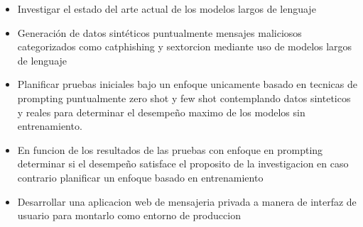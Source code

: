 \documentclass{article}
\begin{document}
\begin{itemize}
    \item Investigar el estado del arte actual de los modelos largos de lenguaje
    \item Generación de datos sintéticos puntualmente mensajes maliciosos categorizados como catphishing y sextorcion mediante uso de modelos largos de lenguaje
    \item Planificar pruebas iniciales bajo un enfoque unicamente basado en tecnicas de prompting puntualmente zero shot y few shot contemplando datos sinteticos y reales para determinar el desempeño maximo de los modelos sin entrenamiento. 

    \item En funcion de los resultados de las pruebas con enfoque en prompting determinar si el desempeño satisface el proposito de la investigacion en caso contrario planificar un enfoque basado en entrenamiento 

    \item Desarrollar una aplicacion web de mensajeria privada a manera de interfaz de usuario para montarlo como entorno de produccion 

    

\end{itemize}
\end{document}
